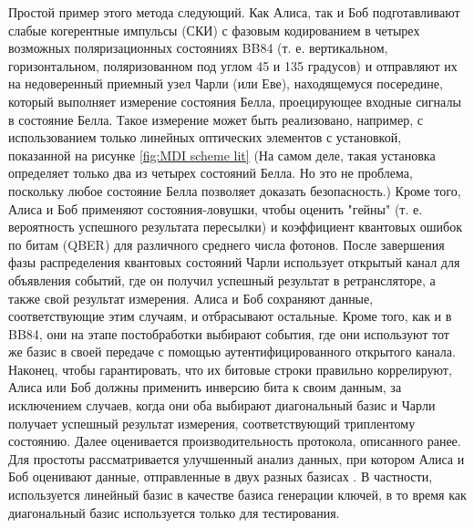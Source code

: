 \newline Простой пример этого метода следующий. Как Алиса, так и Боб подготавливают слабые когерентные импульсы (СКИ) с фазовым кодированием в четырех возможных поляризационных состояниях BB84 (т. е. вертикальном, горизонтальном, поляризованном под углом 45 и 135 градусов) \cite{bennett1984} и отправляют их на недоверенный приемный узел Чарли (или Еве), находящемуся посередине, который выполняет измерение состояния Белла, проецирующее входные сигналы в состояние Белла. Такое измерение может быть реализовано, например, с использованием только линейных оптических элементов с установкой, показанной на рисунке \ref{fig:MDI scheme lit} (На самом деле, такая установка определяет только два из четырех состояний Белла. Но это не проблема, поскольку любое состояние Белла позволяет доказать безопасность.) Кроме того, Алиса и Боб применяют  состояния-ловушки, чтобы оценить "гейны" (т. е. вероятность успешного результата пересылки) и коэффициент квантовых ошибок по битам (QBER) для различного среднего числа фотонов. После завершения фазы распределения квантовых состояний Чарли использует открытый канал для объявления событий, где он получил успешный результат в ретрансляторе, а также свой результат измерения. Алиса и Боб сохраняют данные, соответствующие этим случаям, и отбрасывают остальные. Кроме того, как и в BB84, они на этапе постобработки выбирают события, где они используют тот же базис в своей передаче с помощью аутентифицированного открытого канала. Наконец, чтобы гарантировать, что их битовые строки правильно коррелируют, Алиса или Боб должны применить инверсию бита к своим данным, за исключением случаев, когда они оба выбирают диагональный базис и Чарли получает успешный результат измерения, соответствующий триплентому состоянию. Далее оценивается производительность протокола, описанного ранее. Для простоты рассматривается улучшенный анализ данных, при котором Алиса и Боб оценивают данные, отправленные в двух разных базисах \cite{lo2005}. В частности, используется линейный базис в качестве базиса генерации ключей, в то время как диагональный базис используется только для тестирования.
